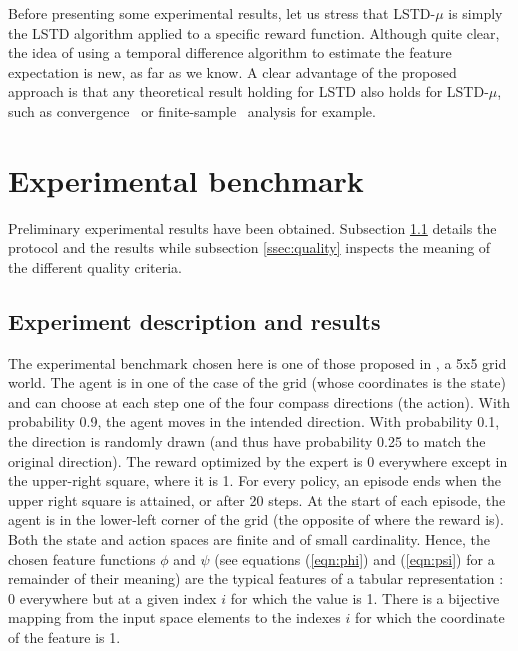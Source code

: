 \documentclass{jfpda2011}
\begin{document}
Before presenting some experimental results, let us stress that
LSTD-$\mu$ is simply the LSTD algorithm applied to a specific reward
function. Although quite clear, the idea of using a temporal
difference algorithm to estimate the feature expectation is new, as
far as we know. A clear advantage of the proposed approach is that
any theoretical result holding for LSTD also holds for LSTD-$\mu$,
such as convergence~\citep{nedic2003least} or
finite-sample~\citep{lazaric2010finiteLSTD} analysis for example.

\section{Experimental benchmark}
\label{sec:exp}
Preliminary experimental results have been obtained. Subsection \ref{ssec:exp} details the protocol and the results while subsection \ref{ssec:quality} inspects the meaning of the different quality criteria. 
\subsection{Experiment description and results}
\label{ssec:exp}
The experimental benchmark chosen here is one of those proposed in \citep{ng2000algorithms}, a 5x5 grid world. The agent is in one of the case of the grid (whose coordinates is the state) and can choose at each step one of the four compass directions (the action). With probability 0.9, the agent moves in the intended direction. With probability 0.1, the direction is randomly drawn (and thus have probability 0.25 to match the original direction). The reward optimized by the expert is 0 everywhere except in the upper-right square, where it is 1. For every policy, an episode ends when the upper right square is attained, or after 20 steps. At the start of each episode, the agent is in the lower-left corner of the grid (the opposite of where the reward is).\\

Both the state and action spaces are finite and of small cardinality. Hence, the chosen feature functions $\phi$ and $\psi$ (see equations (\ref{eqn:phi}) and (\ref{eqn:psi}) for a remainder of their meaning) are the typical features of a tabular representation : 0 everywhere but at a given index $i$ for which the value is 1. There is a bijective mapping from the input space elements to the indexes $i$ for which the coordinate of the feature is 1.\\
\end{document}
